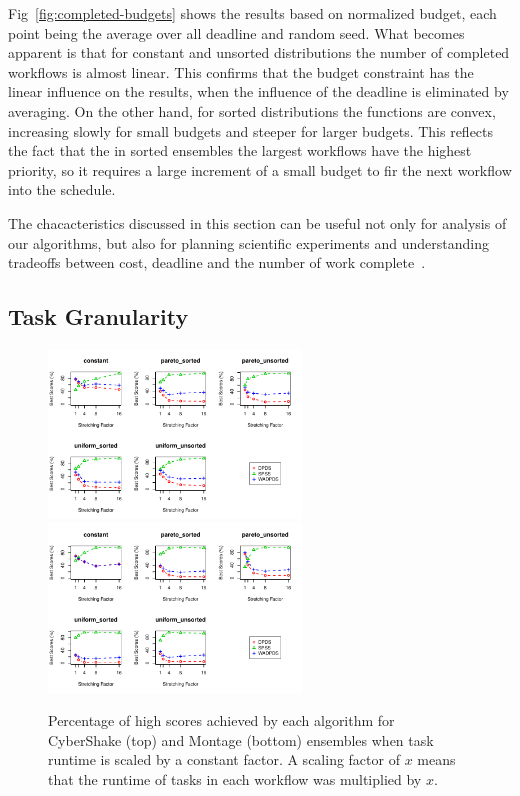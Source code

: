 \documentclass[preprint,5p]{elsarticle}
\begin{document}
Fig~\ref{fig:completed-budgets} shows the results based on normalized budget,
each point being the average over all deadline and random seed. What becomes
apparent is that for constant and unsorted distributions the number of completed
workflows is almost linear. This confirms that the budget constraint has the
linear influence on the results, when the influence of the deadline is
eliminated by averaging. On the other hand, for sorted distributions the
functions are convex, increasing slowly for small budgets and steeper for larger
budgets. This reflects the fact that the in sorted ensembles the largest
workflows have the highest priority, so it requires a large increment of a small
budget to fir the next workflow into the schedule.

The chacacteristics discussed in this section can be useful not only for
analysis of our algorithms, but also for planning scientific experiments and
understanding tradeoffs between cost, deadline and the number of work
complete~\cite{Malawski-FGCS-13}.





\subsection{Task Granularity}
\label{sec:granularity}

\begin{figure}[htb]
    \centering
    \includegraphics[width=0.6\textwidth]{run-stretching-test-output-scaling-CYBERSHAKE}
    \includegraphics[width=0.6\textwidth]{run-stretching-test-output-scaling-MONTAGE}
    \caption{Percentage of high scores achieved by each algorithm for CyberShake (top)
    and Montage (bottom) ensembles when task runtime is scaled by a constant factor. A
    scaling factor of $x$ means that the runtime of tasks in each workflow was
    multiplied by $x$.}
    \label{fig:stretching}
\end{figure}
\end{document}
